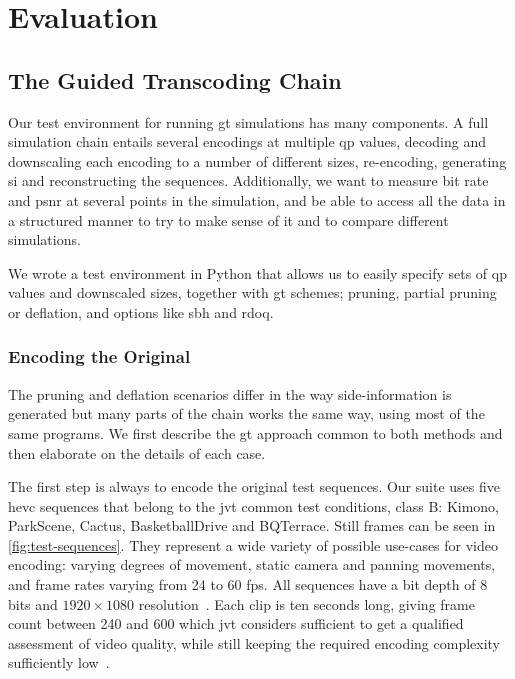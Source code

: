 \chapter{Evaluation}

\section{The Guided Transcoding Chain}
Our test environment for running \gls{gt} simulations has many components. A full simulation chain entails several encodings at multiple \gls{qp} values, decoding and downscaling each encoding to a number of different sizes, re-encoding, generating \gls{si} and reconstructing the sequences. Additionally, we want to measure bit rate and \gls{psnr} at several points in the simulation, and be able to access all the data in a structured manner to try to make sense of it and to compare different simulations.

We wrote a test environment in Python that allows us to easily specify sets of \gls{qp} values and downscaled sizes, together with \gls{gt} schemes; pruning, partial pruning or deflation, and options like \gls{sbh} and \gls{rdoq}.

\subsection{Encoding the Original}
The pruning and deflation scenarios differ in the way side-information is generated but many parts of the chain works the same way, using most of the same programs. We first describe the \gls{gt} approach common to both methods and then elaborate on the details of each case.

The first step is always to encode the original test sequences. Our suite uses five \gls{hevc} sequences that belong to the \gls{jvt} common test conditions, class B: Kimono, ParkScene, Cactus, BasketballDrive and BQTerrace. Still frames can be seen in \cref{fig:test-sequences}. They represent a wide variety of possible use-cases for video encoding: varying degrees of movement, static camera and panning movements, and frame rates varying from 24 to 60 \gls{fps}. All sequences have a bit depth of 8 bits and $1920 \times 1080$ resolution~\cite{Wien_Coding_Tools}. Each clip is ten seconds long, giving frame count between 240 and 600 which \gls{jvt} considers sufficient to get a qualified assessment of video quality, while still keeping the required encoding complexity sufficiently low~\cite{Wien_Coding_Tools}.

